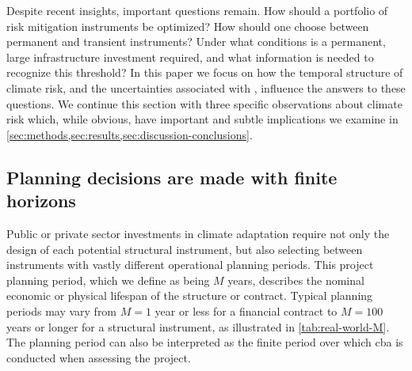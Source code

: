 \documentclass[
  draft,
  linenumbers
]{agujournal2019}
\begin{document}
Despite recent insights, important questions remain.
How should a portfolio of risk mitigation instruments be optimized?
How should one choose between permanent and transient instruments?
Under what conditions is a permanent, large infrastructure investment required, and what information is needed to recognize this threshold?
In this paper we focus on  how the temporal structure of climate risk, and the uncertainties associated with , influence the answers to these questions.
We continue this section with three specific observations about climate risk which, while  obvious, have important and subtle implications  we examine in \cref{sec:methods,sec:results,sec:discussion-conclusions}.

\subsection{Planning decisions are made with finite horizons}\label{sec:intro-finite}

Public or private sector investments in climate adaptation require not only the design of each potential structural instrument, but also selecting between instruments with vastly different operational planning periods.
This project planning period, which we define as being $M$ years, describes the nominal economic or physical lifespan of the structure or contract.
Typical planning periods may vary from $M=1$ year or less for a financial contract to $M=100$ years or longer for a structural instrument, as illustrated in \cref{tab:real-world-M}.
The planning period can also be interpreted as the finite period over which \gls{cba} is conducted when assessing the project.
\end{document}
